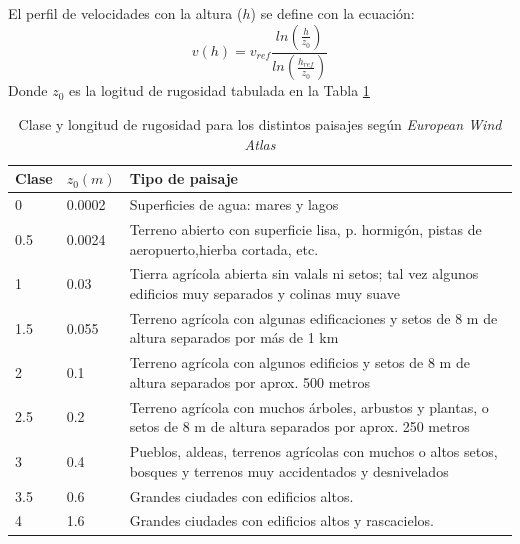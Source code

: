 \documentclass[12pt]{report}
\begin{document}


El perfil de velocidades con la altura ($h$) se define con la ecuación:
\begin{equation}
    v(h) = v_{ref} \frac{ln \left( \frac{h}{z_0} \right)}{ln \left( \frac{h_{ref}}{z_0} \right)}
\end{equation}
Donde $z_0$ es la logitud de rugosidad tabulada en la Tabla \ref{Tabla: Clase y longitud de rugosidad.}

\begin{table}[H]
    \centering
    \begin{tabular}{l l p{13cm}}
        \hline
        Clase & $z_0(m)$ & Tipo de paisaje \\
        \hline
        0 & 0.0002 & Superficies de agua: mares y lagos \\
        0.5 & 0.0024 & Terreno abierto con superficie lisa, p. hormigón, pistas de aeropuerto,hierba cortada, etc. \\
        1 & 0.03 & Tierra agrícola abierta sin valals ni setos; tal vez algunos edificios muy separados y colinas muy suave \\
        1.5 & 0.055 & Terreno agrícola con algunas edificaciones y setos de 8 m de altura separados por más de 1 km \\
        2 & 0.1 & Terreno agrícola con algunos edificios y setos de 8 m de altura separados por aprox. 500 metros \\
        2.5 & 0.2 & Terreno agrícola con muchos árboles, arbustos y plantas, o setos de 8 m de altura separados por aprox. 250 metros \\
        3 & 0.4 & Pueblos, aldeas, terrenos agrícolas con muchos o altos setos, bosques y terrenos muy accidentados y desnivelados \\
        3.5 & 0.6 & Grandes ciudades con edificios altos. \\
        4 & 1.6 & Grandes ciudades con edificios altos y rascacielos. \\ 
        \hline
    \end{tabular}
    
    \caption{Clase y longitud de rugosidad para los distintos paisajes según \textit{European Wind Atlas}}
    \label{Tabla: Clase y longitud de rugosidad.}
\end{table}
\end{document}
